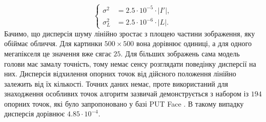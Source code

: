 \begin{equation*}
  \begin{cases}
    \sigma^2 &= 2.5 \cdot 10^{-5} \cdot \left| I' \right|, \\
    \sigma_L^2 &= 2.5 \cdot 10^{-6} \cdot \left| L \right|.
  \end{cases}
\end{equation*}
Бачимо,
що дисперсія шуму лінійно зростає з площею частини зображення,
яку обіймає обличчя.
Для картинки $500 \times 500$ вона дорівнює одиниці,
а для одного мегапікселя це значення вже сягає $25$.
Для більших зображень сама модель голови має замалу точність,
тому немає сенсу розглядати поведінку дисперсії на них.
Дисперсія відхилення опорних точок від дійсного положення
лінійно залежить від їх кількості.
Точних даних немає,
проте використаний для знаходження особливих точок алгоритм
зазвичай демонструється з набором із $194$ опорних точок,
які було запропоновано у базі PUT Face \cite{put-face:2008}.
В такому випадку дисперсія дорівнює $4.85 \cdot 10^{-4}$.
